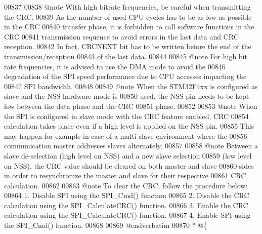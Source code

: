 \begin{DoxyCode}
00837 \textcolor{comment}{}
00838 \textcolor{comment}{@note With high bitrate frequencies, be careful when transmitting the CRC.}
00839 \textcolor{comment}{      As the number of used CPU cycles has to be as low as possible in the CRC }
00840 \textcolor{comment}{      transfer phase, it is forbidden to call software functions in the CRC }
00841 \textcolor{comment}{      transmission sequence to avoid errors in the last data and CRC reception. }
00842 \textcolor{comment}{      In fact, CRCNEXT bit has to be written before the end of the transmission/reception }
00843 \textcolor{comment}{      of the last data.}
00844 \textcolor{comment}{}
00845 \textcolor{comment}{@note For high bit rate frequencies, it is advised to use the DMA mode to avoid the}
00846 \textcolor{comment}{      degradation of the SPI speed performance due to CPU accesses impacting the }
00847 \textcolor{comment}{      SPI bandwidth.}
00848 \textcolor{comment}{}
00849 \textcolor{comment}{@note When the STM32F4xx is configured as slave and the NSS hardware mode is }
00850 \textcolor{comment}{      used, the NSS pin needs to be kept low between the data phase and the CRC }
00851 \textcolor{comment}{      phase.}
00852 \textcolor{comment}{}
00853 \textcolor{comment}{@note When the SPI is configured in slave mode with the CRC feature enabled, CRC}
00854 \textcolor{comment}{      calculation takes place even if a high level is applied on the NSS pin. }
00855 \textcolor{comment}{      This may happen for example in case of a multi-slave environment where the }
00856 \textcolor{comment}{      communication master addresses slaves alternately.}
00857 \textcolor{comment}{}
00858 \textcolor{comment}{@note Between a slave de-selection (high level on NSS) and a new slave selection }
00859 \textcolor{comment}{      (low level on NSS), the CRC value should be cleared on both master and slave}
00860 \textcolor{comment}{      sides in order to resynchronize the master and slave for their respective }
00861 \textcolor{comment}{      CRC calculation.}
00862 \textcolor{comment}{}
00863 \textcolor{comment}{@note To clear the CRC, follow the procedure below:}
00864 \textcolor{comment}{        1. Disable SPI using the SPI\_Cmd() function}
00865 \textcolor{comment}{        2. Disable the CRC calculation using the SPI\_CalculateCRC() function.}
00866 \textcolor{comment}{        3. Enable the CRC calculation using the SPI\_CalculateCRC() function.}
00867 \textcolor{comment}{        4. Enable SPI using the SPI\_Cmd() function.}
00868 \textcolor{comment}{}
00869 \textcolor{comment}{@endverbatim}
00870 \textcolor{comment}{  * @\{}

\end{DoxyCode}
